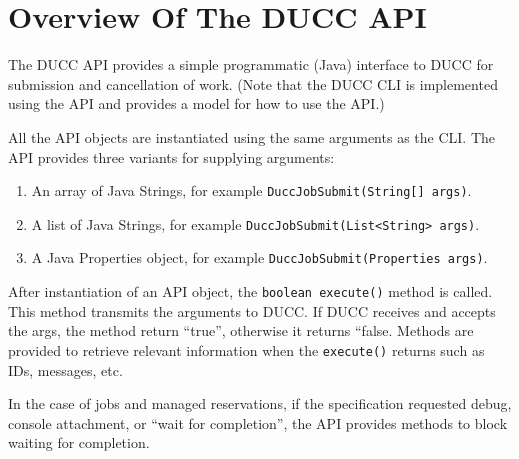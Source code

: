 % 
% 
% 
% 
\section{Overview Of The DUCC API}

   The DUCC API provides a simple programmatic (Java) interface to DUCC for submission and
   cancellation of work.  (Note that the DUCC CLI is implemented using the API and provides a
   model for how to use the API.)

   All the API objects are instantiated using the same arguments as the CLI.  The API
   provides three variants for supplying arguments:
   \begin{enumerate}
     \item An array of Java Strings, for example {\tt DuccJobSubmit(String[] args)}.
     \item A list of Java Strings,   for example {\tt DuccJobSubmit(List<String> args)}.
     \item A Java Properties object, for example {\tt DuccJobSubmit(Properties args)}.
   \end{enumerate}

   After instantiation of an API object, the {\tt boolean execute()} method is called.  This
   method transmits the arguments to DUCC.  If DUCC receives and accepts the args, the method
   return ``true'', otherwise it returns ``false.  Methods are provided to retrieve relevant
   information when the {\tt execute()} returns such as IDs, messages, etc.

   In the case of jobs and managed reservations, if the specification requested debug,
   console attachment, or ``wait for completion'', the API provides methods to block
   waiting for completion.

